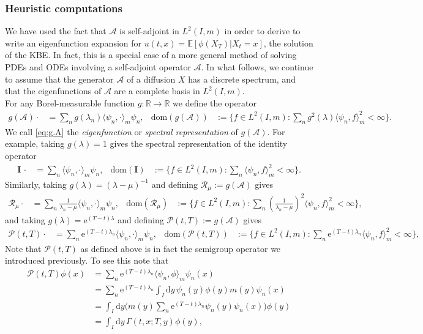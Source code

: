 \documentclass[12pt]{book}
\let\varphi\phi
\numberwithin{equation}{chapter}
\theoremstyle{plain}
\numberwithin{theorem}{section}
\theoremstyle{definition}
\numberwithin{exercise}{chapter}
\newcommand{\<}{\langle}
\renewcommand{\>}{\rangle}
\renewcommand{\(}{\left(}
\renewcommand{\)}{\right)}
\renewcommand{\[}{\left[}
\renewcommand{\]}{\right]}
\newcommand\Eb{\mathds{E}}
\newcommand\Rb{\mathds{R}}
\newcommand\Ac{\mathscr{A}}
\newcommand\Pc{\mathscr{P}}
\newcommand\Rc{\mathscr{R}}
\newcommand\Gam{\Gamma}
\newcommand\lam{\lambda}
\newcommand\Iv{\pmb{I}}
\newcommand\dd{\mathrm{d}}
\newcommand\ee{\mathrm{e}}
\begin{document}
\subsubsection{Heuristic computations}
We have used the fact that $\Ac$ is self-adjoint in $L^2(I,m)$ in order to derive to write an eigenfunction expansion for $u(t,x) = \Eb[ \varphi(X_T) | X_t = x]$, the solution of the KBE.  In fact, this is a special case of a more general method of solving PDEs and ODEs involving a self-adjoint operator $\Ac$.  In what follows, we continue to assume that the generator $\Ac$ of a diffusion $X$ has a discrete spectrum, and that the eigenfunctions of $\Ac$ are a complete basis in $L^2(I,m)$.
\\[0.5em]
For any Borel-measurable function $g : \Rb \to \Rb$ we define the operator
\begin{align}
g(\Ac) \cdot
	&=	\sum_n g(\lam_n) \< \psi_n , \cdot \>_m \psi_n , &
\text{dom}(g(\Ac))
	&:=	\{ f \in L^2(I,m) : \sum_n g^2(\lam) \< \psi_n , f \>_m^2 < \infty \} . \label{eq:g.A}
\end{align}
We call \eqref{eq:g.A} the \emph{eigenfunction} or \emph{spectral representation} of $g(\Ac)$.
For example, taking $g(\lam)=1$ gives the spectral representation of the identity operator
\begin{align}
\Iv \, \cdot
	&=	\sum_n \< \psi_n , \cdot \>_m \psi_n , &
\text{dom}(\Iv)
	&:=	\{ f \in L^2(I,m) : \sum_n \< \psi_n , f \>_m^2 < \infty \} .
\end{align}
Similarly, taking $g(\lam) = (\lam-\mu)^{-1}$ and defining $ \Rc_\mu := g(\Ac)$ gives
\begin{align}
\Rc_\mu \cdot
	&=	\sum_n \frac{1}{\lam_n - \mu} \< \psi_n , \cdot \>_m \psi_n , &
\text{dom}(\Rc_\mu)
	&:=	\{ f \in L^2(I,m) : \sum_n \(\frac{1}{\lam_n-\mu}\)^2 \< \psi_n , f \>_m^2 < \infty \} ,
\end{align}
and taking $g(\lam) = \ee^{(T-t)\lam}$ and defining $\Pc(t,T) := g(\Ac)$ gives
\begin{align}
\Pc(t,T) \cdot
	&=	\sum_n \ee^{(T-t)\lam_n} \< \psi_n , \cdot \>_m \psi_n , &
\text{dom}(\Pc(t,T))
	&:=	\{ f \in L^2(I,m) : \sum_n \ee^{(T-t)\lam_n} \< \psi_n , f \>_m^2 < \infty \} ,
\end{align}
Note that $\Pc(t,T)$ as defined above is in fact the semigroup operator we introduced previously.  To see this note that
\begin{align}
\Pc(t,T) \varphi(x)
	&=	\sum_n \ee^{(T-t)\lam_n} \< \psi_n , \varphi \>_m \psi_n(x) \\
	&=	\sum_n \ee^{(T-t)\lam_n} \int_I \dd y \, \psi_n(y) \varphi(y) m(y) \psi_n(x) \\
	&=	\int_I \dd y \Big( m(y) \sum_n \ee^{(T-t)\lam_n} \psi_n(y) \psi_n(x) \Big) \varphi(y) \\
	&=	\int_I \dd y \, \Gam(t,x;T,y) \varphi(y) ,
\end{align}
\end{document}
